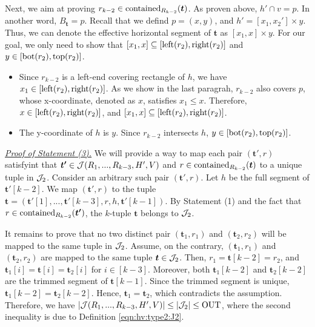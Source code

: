 \vgap 

Next, we aim at proving $r_{k-2}\in \mathrm{contained}_{R_{k-2}}(\textrm{\boldmath${t}$})$. As proven above, $h'\cap v= p$. In another word, $B_\bm{t} = p$. Recall that we defind $p = (x,y)$, and $h' = [x_1,x_2']\times y$. Thus, we can denote the effective horizontal segment of $\bm{t}$ as $[x_1, x] \times y$. For our goal, we only need to show that $[x_1,x] \subseteq [\mathrm{left}(r_2), \mathrm{right}(r_2)]$ and $y \in [\mathrm{bot}(r_2), \mathrm{top}(r_2)]$. 
\begin{itemize}
    \item Since $r_{k-2}$ is a left-end covering rectangle of $h$, we have  $x_1 \in [\mathrm{left}(r_2), \mathrm{right}(r_2)]$. As we show in the last paragrah, $r_{k-2}$ also covers $p$, whose x-coordinate, denoted as $x$, satisfies $x_1 \le x$. Therefore, $x \in [\mathrm{left}(r_2), \mathrm{right}(r_2)]$, and $[x_1,x] \subseteq [\mathrm{left}(r_2), \mathrm{right}(r_2)]$.
    \item The y-coordinate of $h$ is $y$. Since $r_{k-2}$ intersects $h$, $y \in [\mathrm{bot}(r_2), \mathrm{top}(r_2)]$.
\end{itemize}

\vgap 

\noindent \underline{\em Proof of Statement (3).}
We will provide a way to map each pair $(\bm{t'}, r)$ satisfyint that $\textrm{\boldmath${t'}$}\in \mathcal{J}(R_1,...,R_{k-3},H',V)$ and $r \in \mathrm{contained}_{R_{k-2}}(\textrm{\boldmath${t}$})$ to a unique tuple in $\mathcal{J}_2$. Consider an arbitrary such pair $(\bm{t'}, r)$. Let $h$ be the full segment of $\bm{t'}[k-2]$. We map $(\bm{t'}, r)$ to the tuple $\bm{t} = (\bm{t}'[1],...,\bm{t}'[k-3], r, h, \bm{t}'[k-1])$. By Statement (1) and the fact that $r\in \mathrm{contained}_{R_{k-2}}(\textrm{\boldmath${t'}$})$, the $k$-tuple $\bm{t}$ belongs to $\mathcal{J}_2$. 

\vgap 

It remains to prove that no two distinct pair $(\bm{t}_1, r_1)$ and $(\bm{t}_2, r_2)$ will be mapped to the same tuple in $\mathcal{J}_2$. Assume, on the contrary, $(\bm{t}_1, r_1)$ and $(\bm{t}_2, r_2)$ are mapped to the same tuple $\textrm{\boldmath${t}$} \in \mathcal{J}_2$. Then, $r_1 = \bm{t}[k-2] = r_2$, and $\bm{t}_1[i] = \bm{t}[i] = \bm{t}_2[i]$ for $i \in [k-3]$. Moreover, both $\bm{t}_1[k-2]$ and $\bm{t}_2[k-2]$ are the trimmed segment of $\bm{t}[k-1]$. Since the trimmed segment is unique, $\bm{t}_1[k-2] = \bm{t}_2[k-2]$. Hence, $\bm{t}_1 = \bm{t}_2$, which contradicts the assumption. Therefore, we have $|\mathcal{J}(R_1,...,R_{k-3},H',V)| \le |\mathcal{J}_2| \le \mathrm{OUT}$, where the second inequality is due to Definition \eqref{eqn:hv:type2:J2}.
